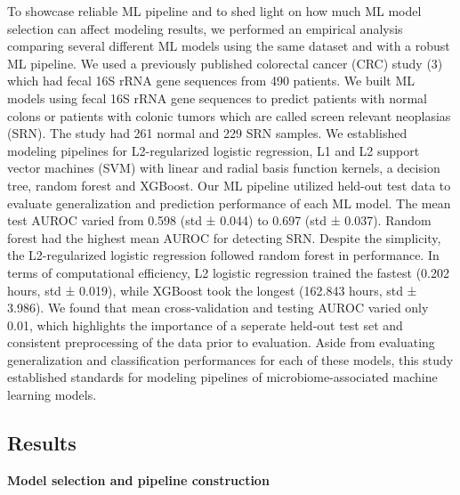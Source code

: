 \documentclass[11pt,]{article}
\begin{document}
To showcase reliable ML pipeline and to shed light on how much ML model
selection can affect modeling results, we performed an empirical
analysis comparing several different ML models using the same dataset
and with a robust ML pipeline. We used a previously published colorectal
cancer (CRC) study (3) which had fecal 16S rRNA gene sequences from 490
patients. We built ML models using fecal 16S rRNA gene sequences to
predict patients with normal colons or patients with colonic tumors
which are called screen relevant neoplasias (SRN). The study had 261
normal and 229 SRN samples. We established modeling pipelines for
L2-regularized logistic regression, L1 and L2 support vector machines
(SVM) with linear and radial basis function kernels, a decision tree,
random forest and XGBoost. Our ML pipeline utilized held-out test data
to evaluate generalization and prediction performance of each ML model.
The mean test AUROC varied from 0.598 (std ± 0.044) to 0.697 (std ±
0.037). Random forest had the highest mean AUROC for detecting SRN.
Despite the simplicity, the L2-regularized logistic regression followed
random forest in performance. In terms of computational efficiency, L2
logistic regression trained the fastest (0.202 hours, std ± 0.019),
while XGBoost took the longest (162.843 hours, std ± 3.986). We found
that mean cross-validation and testing AUROC varied only 0.01, which
highlights the importance of a seperate held-out test set and consistent
preprocessing of the data prior to evaluation. Aside from evaluating
generalization and classification performances for each of these models,
this study established standards for modeling pipelines of
microbiome-associated machine learning models.

\subsection{Results}\label{results}

\textbf{Model selection and pipeline construction}
\end{document}

